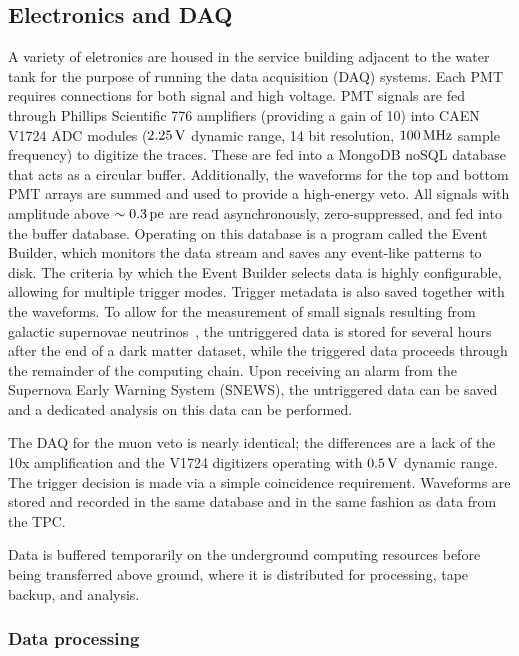 \subsection{Electronics and DAQ}

A variety of eletronics are housed in the service building adjacent to the water tank for the purpose of running the data acquisition (DAQ) systems. Each PMT requires connections for both signal and high voltage. PMT signals are fed through Phillips Scientific 776 amplifiers (providing a gain of 10) into CAEN V1724 ADC modules ($2.25\,\mathrm{V}$ dynamic range, 14 bit resolution, $100\,\mathrm{MHz}$ sample frequency) to digitize the traces. These are fed into a MongoDB noSQL database that acts as a circular buffer. Additionally, the waveforms for the top and bottom PMT arrays are summed and used to provide a high-energy veto. All signals with amplitude above $\sim 0.3\,\mathrm{pe}$ are read asynchronously, zero-suppressed, and fed into the buffer database. Operating on this database is a program called the Event Builder, which monitors the data stream and saves any event-like patterns to disk. The criteria by which the Event Builder selects data is highly configurable, allowing for multiple trigger modes. Trigger metadata is also saved together with the waveforms. To allow for the measurement of small signals resulting from galactic supernovae neutrinos~\cite{Lang:2016zhv}, the untriggered data is stored for several hours after the end of a dark matter dataset, while the triggered data proceeds through the remainder of the computing chain. Upon receiving an alarm from the Supernova Early Warning System (SNEWS), the untriggered data can be saved and a dedicated analysis on this data can be performed.

The DAQ for the muon veto is nearly identical; the differences are a lack of the 10x amplification and the V1724 digitizers operating with $0.5\,\mathrm{V}$ dynamic range. The trigger decision is made via a simple coincidence requirement. Waveforms are stored and recorded in the same database and in the same fashion as data from the TPC.

Data is buffered temporarily on the underground computing resources before being transferred above ground, where it is distributed for processing, tape backup, and analysis.

\subsubsection{Data processing}

